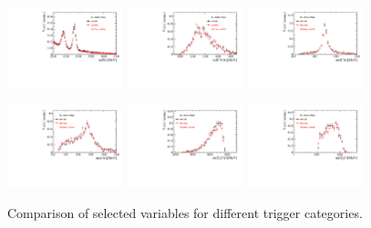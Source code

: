 \begin{figure}[h]
\includegraphics[height=!,width=0.3\textwidth]{figs/dataVsMC/trigger_signal/Ds2all_Bs_DTF_MM.pdf}
\includegraphics[height=!,width=0.3\textwidth]{figs/dataVsMC/trigger_signal/Ds2all_m_Kpipi.pdf}
\includegraphics[height=!,width=0.3\textwidth]{figs/dataVsMC/trigger_signal/Ds2all_m_Kpi.pdf}

\includegraphics[height=!,width=0.3\textwidth]{figs/dataVsMC/trigger_signal/Ds2all_m_pipi.pdf}
\includegraphics[height=!,width=0.3\textwidth]{figs/dataVsMC/trigger_signal/Ds2all_m_Dspipi.pdf}
\includegraphics[height=!,width=0.3\textwidth]{figs/dataVsMC/trigger_signal/Ds2all_m_Dspi.pdf}

\caption{Comparison of selected variables for different trigger categories.}
\label{fig:}
\end{figure}

